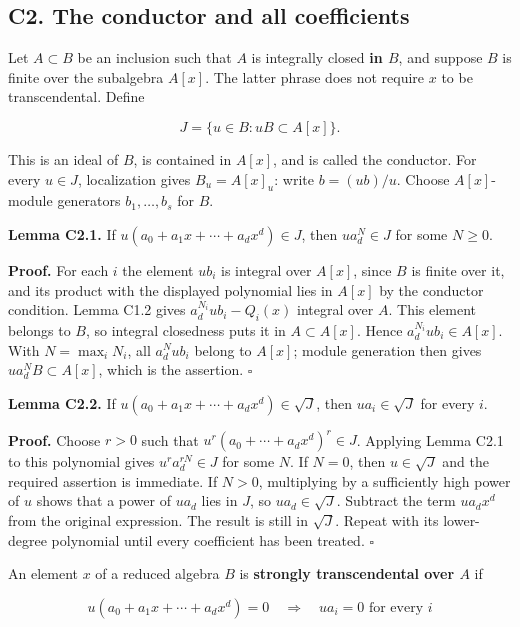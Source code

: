 \documentclass[11pt,a4paper,openany]{report}
\begin{document}
\subsection{C2. The conductor and all coefficients}\label{AG-RG-S04-c2.-the-conductor-and-all-coefficients}

Let \(A\subset B\) be an inclusion such that \(A\) is integrally closed \textbf{in \(B\)}, and suppose \(B\) is finite over the subalgebra \(A[x]\). The latter phrase does not require \(x\) to be transcendental. Define

\[
J=\{u\in B:uB\subset A[x]\}.
\]

This is an ideal of \(B\), is contained in \(A[x]\), and is called the conductor. For every \(u\in J\), localization gives \(B_u=A[x]_u\): write \(b=(ub)/u\). Choose \(A[x]\)-module generators \(b_1,\ldots,b_s\) for \(B\).

\textbf{Lemma C2.1.} If \(u(a_0+a_1x+\cdots+a_dx^d)\in J\), then \(ua_d^N\in J\) for some \(N\ge0\).

\textbf{Proof.} For each \(i\) the element \(ub_i\) is integral over \(A[x]\), since \(B\) is finite over it, and its product with the displayed polynomial lies in \(A[x]\) by the conductor condition. Lemma C1.2 gives \(a_d^{N_i}ub_i-Q_i(x)\) integral over \(A\). This element belongs to \(B\), so integral closedness puts it in \(A\subset A[x]\). Hence \(a_d^{N_i}ub_i\in A[x]\). With \(N=\max_iN_i\), all \(a_d^Nub_i\) belong to \(A[x]\); module generation then gives \(ua_d^NB\subset A[x]\), which is the assertion. \(\square\)

\textbf{Lemma C2.2.} If \(u(a_0+a_1x+\cdots+a_dx^d)\in\sqrt J\), then \(ua_i\in\sqrt J\) for every \(i\).

\textbf{Proof.} Choose \(r>0\) such that \(u^r(a_0+\cdots+a_dx^d)^r\in J\). Applying Lemma C2.1 to this polynomial gives \(u^ra_d^{rN}\in J\) for some \(N\). If \(N=0\), then \(u\in\sqrt J\) and the required assertion is immediate. If \(N>0\), multiplying by a sufficiently high power of \(u\) shows that a power of \(ua_d\) lies in \(J\), so \(ua_d\in\sqrt J\). Subtract the term \(ua_dx^d\) from the original expression. The result is still in \(\sqrt J\). Repeat with its lower-degree polynomial until every coefficient has been treated. \(\square\)

An element \(x\) of a reduced algebra \(B\) is \textbf{strongly transcendental over \(A\)} if

\[
u(a_0+a_1x+\cdots+a_dx^d)=0
\quad\Longrightarrow\quad ua_i=0\text{ for every }i
\]
\end{document}
